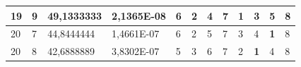 \documentclass[conference]{IEEEtran}
\begin{document}
\begin{table}[]
\begin{tabular}{|llll|llllllll|}
\multicolumn{1}{|l|}{19}                                                    & \multicolumn{1}{l|}{9}                                                        & \multicolumn{1}{l|}{49,1333333}                                                   & 2,1365E-08                     & \multicolumn{1}{l|}{6}                                                  & \multicolumn{1}{l|}{2}                                                  & \multicolumn{1}{l|}{4}                                                  & \multicolumn{1}{l|}{7}                                                  & \multicolumn{1}{l|}{\textbf{1}}                                         & \multicolumn{1}{l|}{3}                                                  & \multicolumn{1}{l|}{5}                                                  & 8                          \\ \hline
\multicolumn{1}{|l|}{20}                                                    & \multicolumn{1}{l|}{7}                                                        & \multicolumn{1}{l|}{44,8444444}                                                   & 1,4661E-07                     & \multicolumn{1}{l|}{6}                                                  & \multicolumn{1}{l|}{2}                                                  & \multicolumn{1}{l|}{5}                                                  & \multicolumn{1}{l|}{7}                                                  & \multicolumn{1}{l|}{3}                                                  & \multicolumn{1}{l|}{4}                                                  & \multicolumn{1}{l|}{\textbf{1}}                                         & 8                          \\ \hline
\multicolumn{1}{|l|}{20}                                                    & \multicolumn{1}{l|}{8}                                                        & \multicolumn{1}{l|}{42,6888889}                                                   & 3,8302E-07                     & \multicolumn{1}{l|}{5}                                                  & \multicolumn{1}{l|}{3}                                                  & \multicolumn{1}{l|}{6}                                                  & \multicolumn{1}{l|}{7}                                                  & \multicolumn{1}{l|}{2}                                                  & \multicolumn{1}{l|}{\textbf{1}}                                         & \multicolumn{1}{l|}{4}                                                  & 8                          \\ \hline

\end{tabular}
\end{table}
\end{document}
